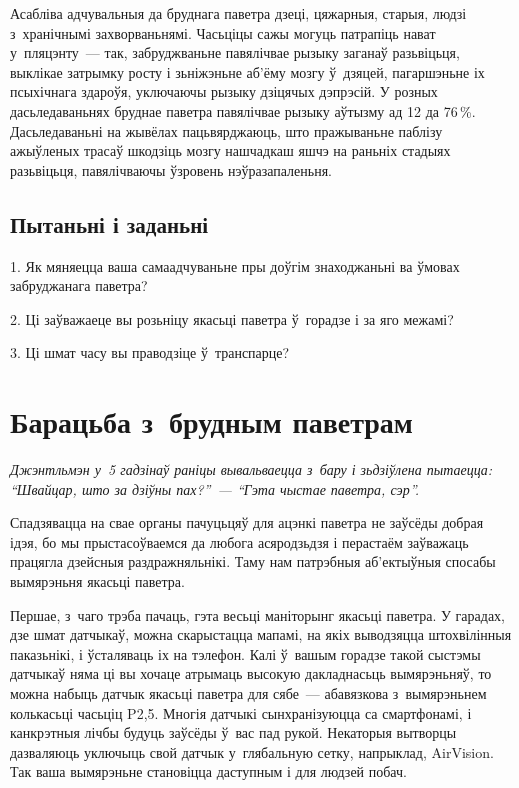 Асабліва адчувальныя да бруднага паветра дзеці, цяжарныя, старыя, людзі з~хранічнымі захворваньнямі. Часьціцы сажы могуць патрапіць нават у~пляцэнту~--- так, забруджваньне павялічвае рызыку заганаў разьвіцьця, выклікае затрымку росту і зьніжэньне аб'ёму мозгу ў~дзяцей, пагаршэньне іх псыхічнага здароўя, уключаючы рызыку дзіцячых дэпрэсій. У розных дасьледаваньнях бруднае паветра павялічвае рызыку аўтызму ад 12 да 76\,\%. Дасьледаваньні на жывёлах пацьвярджаюць, што пражываньне паблізу ажыўленых трасаў шкодзіць мозгу нашчадкаш яшчэ на раньніх стадыях разьвіцьця, павялічваючы ўзровень нэўразапаленьня.

\subsection*{Пытаньні і заданьні}

1. Як мяняецца ваша самаадчуваньне пры доўгім знаходжаньні ва ўмовах забруджанага паветра?

2. Ці заўважаеце вы розьніцу якасьці паветра ў~горадзе і за яго межамі?

3. Ці шмат часу вы праводзіце ў~транспарце?


\section{Барацьба з~брудным паветрам}

\emph{Джэнтльмэн у~5 гадзінаў раніцы вывальваецца з~бару і зьдзіўлена пытаецца: ``Швайцар, што за дзіўны пах?''~--- ``Гэта чыстае паветра, сэр''.}

Спадзявацца на свае органы пачуцьцяў для ацэнкі паветра не заўсёды добрая ідэя, бо мы прыстасоўваемся да любога асяродзьдзя і перастаём заўважаць працягла дзейсныя раздражняльнікі. Таму нам патрэбныя аб'ектыўныя спосабы вымярэньня якасьці паветра.

Першае, з~чаго трэба пачаць, гэта весьці маніторынг якасьці паветра. У гарадах, дзе шмат датчыкаў, можна скарыстацца мапамі, на якіх выводзяцца штохвілінныя паказьнікі, і ўсталяваць іх на тэлефон. Калі ў~вашым горадзе такой сыстэмы датчыкаў няма ці вы хочаце атрымаць высокую дакладнасьць вымярэньняў, то можна набыць датчык якасьці паветра для сябе~--- абавязкова з~вымярэньнем колькасьці часьціц P2,5. Многія датчыкі сынхранізуюцца са смартфонамі, і канкрэтныя лічбы будуць заўсёды ў~вас пад рукой. Некаторыя вытворцы дазваляюць уключыць свой датчык у~глябальную сетку, напрыклад, AirVision. Так ваша вымярэньне становіцца даступным і для людзей побач.

